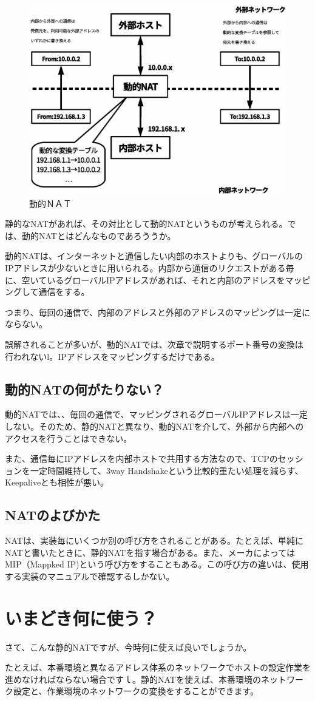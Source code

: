 \begin{figure}[htbp]
	\includegraphics[width=12cm,clip]{draw/fig8.eps}
	\caption{動的ＮＡＴ}
	\label{fig:dynamic-nat}
\end{figure}

静的なNATがあれば、その対比として動的NATというものが考えられる。では、動的NATとはどんなものであろううか。

動的NATは、インターネットと通信したい内部のホストよりも、グローバルのIPアドレスが少ないときに用いられる。内部から通信のリクエストがある毎に、空いているグローバルIPアドレスがあれば、それと内部のアドレスをマッピングして通信をする。

つまり、毎回の通信で、内部のアドレスと外部のアドレスのマッピングは一定にならない。

誤解されることが多いが、動的NATでは、次章で説明するポート番号の変換は行われないl。IPアドレスをマッピングするだけである。


\subsection{動的NATの何がたりない？}

動的NATでは、、毎回の通信で、マッピングされるグローバルIPアドレスは一定しない。そのため、静的NATと異なり、動的NATを介して、外部から内部へのアクセスを行うことはできない。

また、通信毎にIPアドレスを内部ホストで共用する方法なので、TCPのセッションを一定時間維持して、3way Handshakeという比較的重たい処理を減らす、Keepaliveとも相性が悪い。

\subsection{NATのよびかた}
NATは、実装毎にいくつか別の呼び方をされることがある。たとえば、単純にNATと書いたときに、静的NATを指す場合がある。また、メーカによってはMIP（Mappked IP)という呼び方をすることもある。この呼び方の違いは、使用する実装のマニュアルで確認するしかない。

\section{いまどき何に使う？}
さて、こんな静的NATですが、今時何に使えば良いでしょうか。

たとえば、本番環境と異なるアドレス体系のネットワークでホストの設定作業を進めなければならない場合ですｌ。静的NATを使えば、本番環境のネットワーク設定と、作業環境のネットワークの変換をすることができます。
